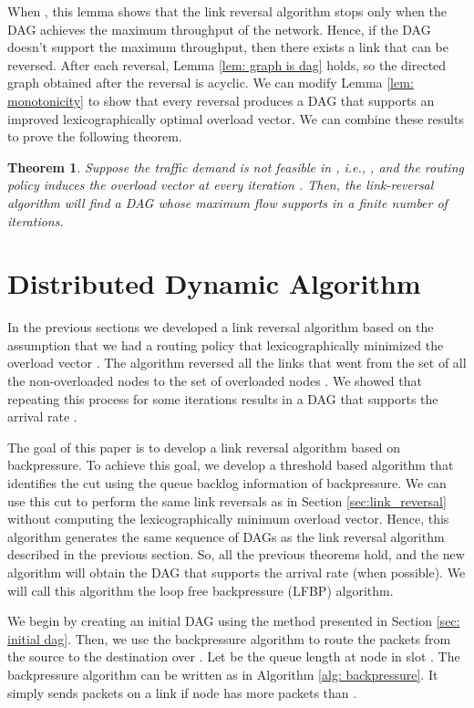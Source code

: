 \documentclass{sig-alternate-2013}
\newtheorem{theorem}{Theorem}
\begin{document}
When , this lemma shows that the link reversal algorithm stops only when the DAG achieves the maximum throughput of the network.  Hence, if the DAG doesn't support the maximum throughput, then there exists a link that can be reversed. After each reversal, Lemma \ref{lem: graph is dag} holds, so the directed graph obtained after the reversal is acyclic. We can modify Lemma \ref{lem: monotonicity} to show that every reversal produces a DAG that supports  an improved lexicographically optimal overload vector. We can combine these results to prove the following theorem.
\begin{theorem}
Suppose the traffic demand is not feasible in , i.e., , and the routing policy induces the overload vector  at every iteration . Then, the link-reversal algorithm will find a DAG whose maximum flow supports  in a finite number of iterations.
\end{theorem}


\section{Distributed Dynamic Algorithm} \label{dynamic algorithm}

In the previous sections we developed a link reversal algorithm based on the assumption that we had a routing policy that lexicographically minimized the overload vector . The algorithm reversed all the links that went from the set of all the non-overloaded nodes  to the set of overloaded nodes . We showed that repeating this process for some iterations results in a DAG that supports the arrival rate . 

The goal of this paper is to develop a link reversal algorithm based on backpressure. To achieve this goal, we develop a threshold based algorithm that identifies the cut  using the queue backlog information of backpressure. We can use this cut to perform the same link reversals as in Section \ref{sec:link_reversal} without computing the lexicographically minimum overload vector. Hence, this algorithm generates the same sequence of DAGs as the link reversal algorithm described in the previous section. So, all the previous theorems hold, and the new algorithm will obtain the DAG that supports the arrival rate  (when possible). We will call this algorithm the loop free backpressure (LFBP) algorithm.





We begin by creating an initial DAG  using 
 the method presented in Section \ref{sec: initial dag}. Then, we use the backpressure algorithm to route the packets from the source to the destination over .
 Let  be the queue length  at node  in slot . The backpressure algorithm can be written as in Algorithm \ref{alg: backpressure}. It simply sends packets on a link  if node  has more packets than .
\end{document}
